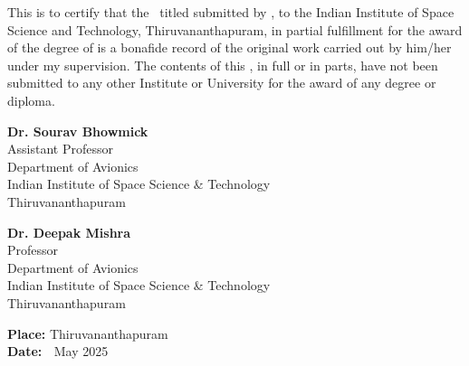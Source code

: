 This is to certify that the \Doctype\ titled \textbf{\textit{\Title}}
submitted by {\bf\Author}, to the Indian Institute of Space Science and
Technology, Thiruvananthapuram, in partial fulfillment for the award of the
degree of {\bf\Degreetext} is a bonafide record of the original work carried
out by him/her under my supervision. The contents of this \Doctype, in full or
in parts, have not been submitted to any other Institute or University for
the award of any degree or diploma.

\vspace{10 mm}
\noindent
\begin{minipage}{0.52\textwidth}
\textbf{Dr. Sourav Bhowmick}\\
Assistant Professor\\
Department of Avionics\\
Indian Institute of Space Science \& Technology\\
Thiruvananthapuram
\end{minipage}
\hspace{15mm}
\begin{minipage}{0.52\textwidth}
\raggedright{\textbf{Dr. Deepak Mishra}}\\
Professor\\
Department of Avionics\\
Indian Institute of Space Science \& Technology\\
Thiruvananthapuram
\end{minipage}

\vspace{25mm}
\noindent
\begin{minipage}{0.5\textwidth}
\textbf{Place: }Thiruvananthapuram \\
\textbf{Date: \ }May 2025
\end{minipage}











